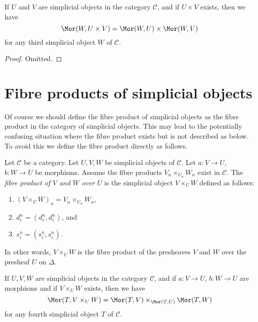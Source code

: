 \begin{lemma}
\label{lemma-product}
If $U$ and $V$ are simplicial objects in the category $\mathcal{C}$,
and if $U \times V$ exists, then we have
$$
\Mor(W, U \times V) =
\Mor(W, U) \times
\Mor(W, V)
$$
for any third simplicial object $W$ of $\mathcal{C}$.
\end{lemma}

\begin{proof}
Omitted.
\end{proof}


\section{Fibre products of simplicial objects}
\label{section-fibre-products}

\noindent
Of course we should define the fibre product of simplicial objects
as the fibre product in the category of simplicial objects. This
may lead to the potentially confusing situation where the
fibre product exists but is not described as below. To avoid
this we define the fibre product directly as follows.

\begin{definition}
\label{definition-fibre-product}
Let $\mathcal{C}$ be a category.
Let $U, V, W$ be simplicial objects of $\mathcal{C}$.
Let $a : V \to U$, $b : W \to U$ be morphisms.
Assume the fibre products $V_n \times_{U_n} W_n$ exist in $\mathcal{C}$.
The {\it fibre product of $V$ and $W$ over $U$} is the simplicial object
$V \times_U W$ defined as follows:
\begin{enumerate}
\item $(V \times_U W)_n = V_n \times_{U_n} W_n$,
\item $d^n_i = (d^n_i, d^n_i)$, and
\item $s^n_i = (s^n_i, s^n_i)$.
\end{enumerate}
In other words, $V \times_U W$ is the fibre product of the presheaves
$V$ and $W$ over the presheaf $U$ on $\Delta$.
\end{definition}

\begin{lemma}
\label{lemma-fibre-product}
If $U, V, W$ are simplicial objects in the category $\mathcal{C}$,
and if $a : V \to U$, $b : W \to U$ are morphisms
and if $V \times_U W$ exists, then we have
$$
\Mor(T, V \times_U W) =
\Mor(T, V) \times_{\Mor(T, U)}
\Mor(T, W)
$$
for any fourth simplicial object $T$ of $\mathcal{C}$.
\end{lemma}

